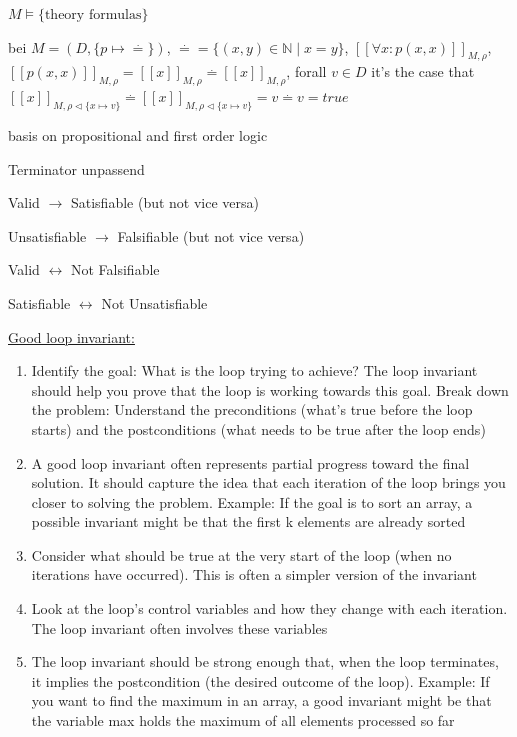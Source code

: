\documentclass[landscape, a4paper]{article}
\begin{document}
\begin{minipage}[t]{0.2\linewidth}
\begin{betterlist}
		\item $M \models \{\text{theory formulas}\}$
		\item bei $M = (D,\{p \mapsto \overset{.}{=}\})$, $\overset{.}{=} {=} \{(x, y)\in \mathbb{N} \mid x = y\}$, $[[\forall x: p(x, x)]]_{M, \rho}$, $[[p(x, x)]]_{M, \rho} = [[x]]_{M, \rho} \overset{.}{=} [[x]]_{M, \rho}$, forall $v\in D$ it's the case that $[[x]]_{M, \rho\triangleleft\{x \mapsto v\}} \overset{.}{=} [[x]]_{M, \rho\triangleleft\{x \mapsto v\}} = v \overset{.}{=} v = true$
		\item basis on propositional and first order logic
    \item Terminator unpassend
		\begin{betterlist}
			\item Valid $\rightarrow$ Satisfiable (but not vice versa)
			\item Unsatisfiable $\rightarrow$ Falsifiable (but not vice versa)
			\item Valid $\leftrightarrow$ Not Falsifiable
			\item Satisfiable $\leftrightarrow$ Not Unsatisfiable
		\end{betterlist}
		\item \underline{Good loop invariant:}
		\begin{enumerate}
			\item Identify the goal: What is the loop trying to achieve? The loop invariant should help you prove that the loop is working towards this goal.
			Break down the problem: Understand the preconditions (what’s true before the loop starts) and the postconditions (what needs to be true after the loop ends)
			\item A good loop invariant often represents partial progress toward the final solution. It should capture the idea that each iteration of the loop brings you closer to solving the problem. Example: If the goal is to sort an array, a possible invariant might be that the first k elements are already sorted
			\item Consider what should be true at the very start of the loop (when no iterations have occurred). This is often a simpler version of the invariant
			\item Look at the loop's control variables and how they change with each iteration. The loop invariant often involves these variables
			\item The loop invariant should be strong enough that, when the loop terminates, it implies the postcondition (the desired outcome of the loop). Example: If you want to find the maximum in an array, a good invariant might be that the variable max holds the maximum of all elements processed so far

\end{enumerate}
\end{betterlist}
\end{minipage}
\end{document}
